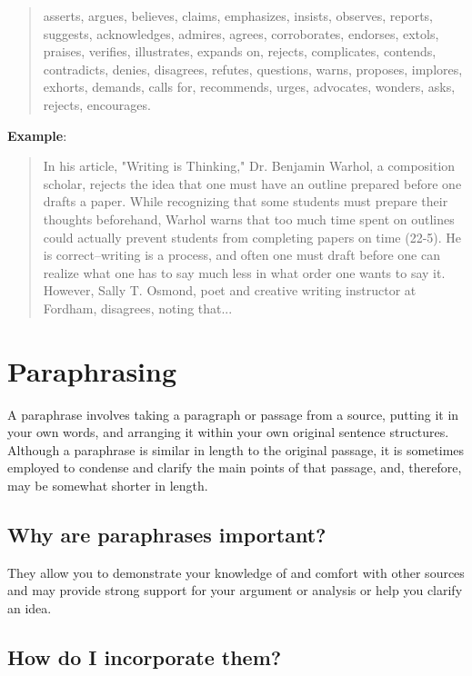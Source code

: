 \begin{quote}asserts, argues, believes, claims, emphasizes, insists, observes, reports, 
suggests, acknowledges, admires, agrees, corroborates, endorses, extols, praises, 
verifies, illustrates, expands on, rejects, complicates, contends, contradicts, denies, 
disagrees, refutes, questions, warns, proposes, implores, exhorts, demands, calls for, 
recommends, urges, advocates, wonders, asks, rejects, encourages.\end{quote}
 
 
\textbf{Example}:
 
 \begin{quote}
In his article, "Writing is Thinking," Dr. Benjamin Warhol, a composition scholar, rejects 
the idea that one must have an outline prepared before one drafts a paper. While 
recognizing that some students must prepare their thoughts beforehand, Warhol warns 
that too much time spent on outlines could actually prevent students from completing 
papers on time (22-5). He is correct--writing  is a process, and often one must draft 
before one  can realize what one has to say much less in what order one wants to say it. 
However, Sally T. Osmond, poet and  creative writing instructor at Fordham, disagrees,
 noting that... \end{quote}

\section{Paraphrasing}

A paraphrase involves taking a paragraph or passage from a source, putting it in your 
own words, and arranging it within your own original sentence structures. Although a 
paraphrase is similar in length to the original passage, it is sometimes employed to 
condense and clarify the main points of that passage, and, therefore, may be somewhat 
shorter in length.

\subsection{Why are paraphrases important?}

They allow you to demonstrate your knowledge of and comfort with other sources and 
may provide strong support for your argument or analysis or help you clarify an idea.

\subsection{How do I incorporate them?}

